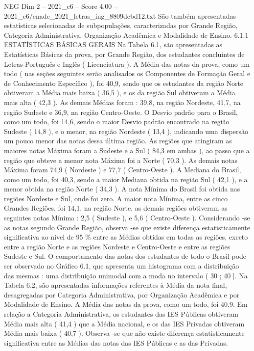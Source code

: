 \begin{textsample}{NEG Dim 2 – 2021\_c6 – Score 4.00 – 2021\_c6/enade\_2021\_letras\_ing\_8809dcbd12.txt}
São também apresentadas estatísticas selecionadas de subpopulações, caracterizadas por Grande Região, Categoria Administrativa, Organização Acadêmica e Modalidade de Ensino. 6.1.1 ESTATÍSTICAS BÁSICAS GERAIS Na Tabela 6.1, são apresentadas as Estatísticas Básicas da prova, por Grande Região, dos estudantes concluintes de Letras-Português e Inglês ( Licenciatura ).
A Média das notas da prova, como um todo ( nas seções seguintes serão analisados os Componentes de Formação Geral e de Conhecimento Específico ), foi 40,9, sendo que os estudantes da região Norte obtiveram a Média mais baixa ( 36,5 ), e os da região Sul obtiveram a Média mais alta ( 42,3 ).
As demais Médias foram : 39,8, na região Nordeste, 41,7, na região Sudeste e 36,9, na região Centro-Oeste.
O Desvio padrão para o Brasil, como um todo, foi 14,6, sendo o maior Desvio padrão encontrado na região Sudeste ( 14,8 ), e o menor, na região Nordeste ( 13,4 ), indicando uma dispersão um pouco menor das notas dessa última região.
As regiões que atingiram as maiores notas Máxima foram a Sudeste e a Sul ( 84,3 em ambas ), ao passo que a região que obteve a menor nota Máxima foi a Norte ( 70,3 ).
As demais notas Máxima foram 74,9 ( Nordeste ) e 77,7 ( Centro-Oeste ).
A Mediana do Brasil, como um todo, foi 40,3, sendo a maior Mediana obtida na região Sul ( 42,1 ), e a menor obtida na região Norte ( 34,3 ).
A nota Mínima do Brasil foi obtida nas regiões Nordeste e Sul, onde foi zero.
A maior nota Mínima, entre as cinco Grandes Regiões, foi 14,1, na região Norte, as demais regiões obtiveram as seguintes notas Mínima : 2,5 ( Sudeste ), e 5,6 ( Centro-Oeste ).
Considerando -se as notas segundo Grande Região, observa -se que existe diferença estatisticamente significativa ao nível de 95 \% entre as Médias obtidas em todas as regiões, exceto entre a região Norte e as regiões Nordeste e Centro-Oeste e entre as regiões Sudeste e Sul.
O comportamento das notas dos estudantes de todo o Brasil pode ser observado no Gráfico 6.1, que apresenta um histograma com a distribuição das mesmas : uma distribuição unimodal com a moda no intervalo ( 30 ; 40 ].
Na Tabela 6.2, são apresentadas informações referentes à Média da nota final, desagregadas por Categoria Administrativa, por Organização Acadêmica e por Modalidade de Ensino.
A Média das notas da prova, como um todo, foi 40,9.
Em relação a Categoria Administrativa, os estudantes das IES Públicas obtiveram Média mais alta ( 41,4 ) que a Média nacional, e os das IES Privadas obtiveram Média mais baixa ( 40,7 ).
Observa -se que não existe diferença estatisticamente significativa entre as Médias das notas das IES Públicas e as das Privadas.

\end{textsample}
